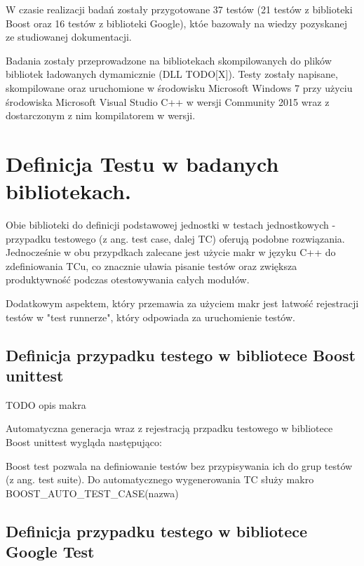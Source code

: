 \documentclass[12pt,a4paper,notitlepage]{report}
\begin{document}
W czasie realizacji badań zostały przygotowane 37 testów (21 testów z biblioteki Boost oraz 16 testów z biblioteki Google), któe bazowały na wiedzy pozyskanej ze studiowanej dokumentacji.

Badania zostały przeprowadzone na bibliotekach skompilowanych do plików bibliotek ładowanych dymamicznie (DLL TODO[X]). Testy zostały napisane, skompilowane oraz uruchomione w środowisku Microsoft Windows 7 przy użyciu środowiska Microsoft Visual Studio C++ w wersji Community 2015 wraz z dostarczonym z nim kompilatorem w wersji.



\chapter{Definicja Testu w badanych bibliotekach.}

Obie biblioteki do definicji podstawowej jednostki w testach jednostkowych - przypadku testowego (z ang. test case, dalej TC) oferują podobne rozwiązania. Jednocześnie w obu przypdkach zalecane jest użycie makr w języku C++ do zdefiniowania TCu, co znacznie uławia pisanie testów oraz zwiększa produktywność podczas otestowywania całych modułów.

Dodatkowym aspektem, który przemawia za użyciem makr jest łatwość rejestracji testów w "test runnerze", który odpowiada za uruchomienie testów.



\section{Definicja przypadku testego w bibliotece Boost unittest}

TODO opis makra

Automatyczna generacja wraz z rejestracją przpadku testowego w bibliotece Boost unittest wygląda następująco:

			

Boost test pozwala na definiowanie testów bez przypisywania ich do grup testów (z ang. test suite). Do automatycznego wygenerowania TC służy makro BOOST{\_}AUTO{\_}TEST{\_}CASE(nazwa){}

\section{Definicja przypadku testego w bibliotece Google Test}
\end{document}
